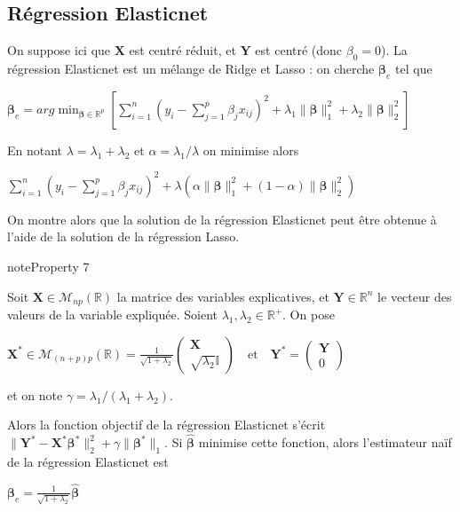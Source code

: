 \documentclass[letterpaper,10pt,english]{jupyterBook}
\begin{document}
\subsection{Régression Elasticnet}
\label{\detokenize{regression:regression-elasticnet}}
\ignorespaces 
{}\ignorespaces 
\sphinxAtStartPar
On suppose ici que \(\mathbf X\) est centré réduit, et \(\mathbf Y\) est centré (donc \(\beta_0=0\)). La régression Elasticnet est un mélange de Ridge et Lasso : on cherche \(\boldsymbol\beta_e\) tel que

\sphinxAtStartPar
\(\boldsymbol\beta_e = arg\displaystyle\min_{\boldsymbol\beta\in\mathbb{R}^{p}}\left [\displaystyle\sum_{i=1}^n \left (y_i-\displaystyle\sum_{j=1}^p \beta_j x_{ij}\right )^2+\lambda_1 \| \boldsymbol\beta\|^2_1 + \lambda_2 \| \boldsymbol\beta\|^2_2\right ]\)

\sphinxAtStartPar
En notant \(\lambda =\lambda_1+\lambda_2\) et \( \alpha = \lambda_1/\lambda\) on minimise alors

\sphinxAtStartPar
\(\displaystyle\sum_{i=1}^n \left (y_i-\displaystyle\sum_{j=1}^p \beta_j x_{ij}\right )^2+\lambda(\alpha \| \boldsymbol\beta\|^2_1 + (1-\alpha) \| \boldsymbol\beta\|^2_2)\)

\sphinxAtStartPar
On montre alors que la solution de la régression Elasticnet peut être obtenue à l’aide de la solution de la régression Lasso.
\label{regression:property-5}
\begin{sphinxadmonition}{note}{Property 7}



\sphinxAtStartPar
Soit \(\mathbf X\in\mathcal{M}_{np}(\mathbb R)\) la matrice des variables explicatives, et \(\mathbf Y\in\mathbb{R}^n\) le vecteur des valeurs de la variable expliquée. Soient \(\lambda_1,\lambda_2\in\mathbb{R}^+\). On pose

\sphinxAtStartPar
\(\mathbf X^*\in\mathcal{M}_{(n+p)p}(\mathbb R) = \frac{1}{\sqrt{1+\lambda_2}}\begin{pmatrix}\mathbf X\\\sqrt{\lambda_2 }\mathbb{I}\end{pmatrix}\quad\text{et}\quad \mathbf Y^*=\begin{pmatrix}\mathbf Y\\0\end{pmatrix}\)

\sphinxAtStartPar
et on note \(\gamma=\lambda_1/(\lambda_1+\lambda_2)\).

\sphinxAtStartPar
Alors la fonction objectif de la régression Elasticnet s’écrit \(\|\mathbf Y^*-\mathbf X^*\boldsymbol\beta^*\|_2^2+\gamma\|\boldsymbol\beta^*\|_1\).
Si \(\hat{\boldsymbol\beta}\) minimise cette fonction, alors l’estimateur naïf de la régression Elasticnet est

\sphinxAtStartPar
\(\boldsymbol\beta_e = \frac{1}{\sqrt{1+\lambda_2}}\hat{\boldsymbol\beta}\)
\end{sphinxadmonition}
\end{document}

